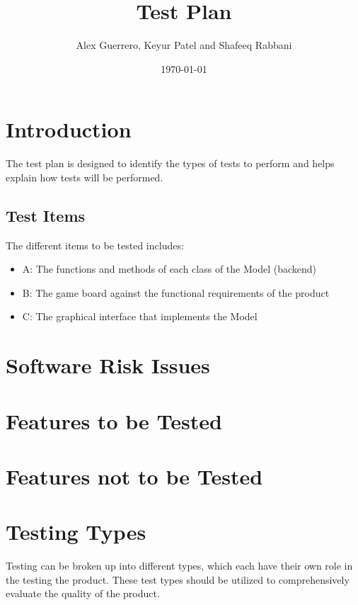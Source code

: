 \documentclass[12pt]{article}
\begin{document}
\title{Test Plan} 
\author{Alex Guerrero, Keyur Patel and Shafeeq Rabbani}
\date{\today}

\maketitle

\tableofcontents
\newpage
%
%

\section{Introduction}
The test plan is designed to identify the types of tests to perform and helps explain how tests will be performed.

\subsection{Test Items}
The different items to be tested includes:

\begin{itemize}
\item A: The functions and methods of each class of the Model (backend)
\item B: The game board against the functional requirements of the product
\item C: The graphical interface that implements the Model 
\end{itemize}

\section{Software Risk Issues}

\section{Features to be Tested}

\section{Features not to be Tested}


\section{Testing Types}
Testing can be broken up into different types, which each have their own role in the testing the product. These test types should be utilized to comprehensively evaluate the quality of the product.
\end{document}
